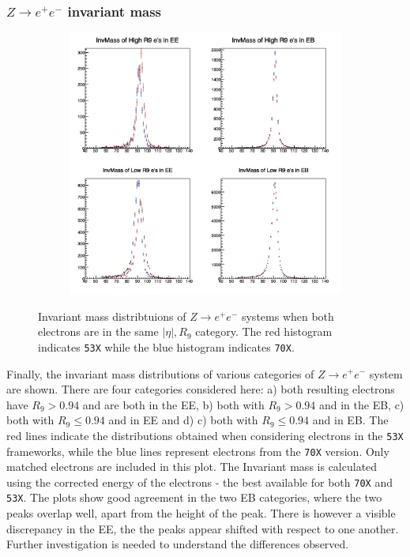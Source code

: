 \documentclass[10pt]{article}
\begin{document}
\subsubsection{$Z\rightarrow e^+ e^-$ invariant mass }
\begin{figure}[h!]
        \centering
        \begin{subfigure}[b]{0.8\textwidth}
                \includegraphics[width=\textwidth]{Plots/Zee_corr}
        \end{subfigure}
        \caption{Invariant mass distribtuions of $Z\rightarrow e^+e^-$ systems when both electrons are in the same $|\eta|,R_9$ category. The red histogram indicates \texttt{53X} while the blue histogram indicates \texttt{70X}.}\label{ZeeValidation}
\end{figure}

Finally, the invariant mass distributions of various categories of $Z \rightarrow e^+e^-$ system are shown. There are four categories considered here: a) both resulting electrons have $R_9 >0.94$ and are both in the EE, b) both with $R_9>0.94$ and in the EB, c) both with $R_9 \leq 0.94$ and in EE and d) c) both with $R_9 \leq 0.94$ and in EB. The red lines indicate the distributions obtained when considering electrons in the \texttt{53X} frameworks, while the blue lines represent electrons from the \texttt{70X} version. Only matched electrons are included in this plot. The Invariant mass is calculated using the corrected energy of the electrons - the best available for both \texttt{70X} and \texttt{53X}. The plots show good agreement in the two EB categories, where the two peaks overlap well, apart from the height of the peak. There is however a visible discrepancy in the EE, the the peaks appear shifted with respect to one another. Further investigation is needed to understand the differences observed.
\end{document}
